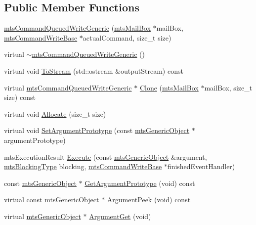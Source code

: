 \subsection*{Public Member Functions}
\begin{DoxyCompactItemize}
\item 
\hyperlink{classmts_command_queued_write_generic_aaafdcc6e3828ed2308806cd33da98c58}{mts\+Command\+Queued\+Write\+Generic} (\hyperlink{classmts_mail_box}{mts\+Mail\+Box} $\ast$mail\+Box, \hyperlink{classmts_command_write_base}{mts\+Command\+Write\+Base} $\ast$actual\+Command, size\+\_\+t size)
\item 
virtual \hyperlink{classmts_command_queued_write_generic_af6ee1d684b4a16823d61a85cd619c900}{$\sim$mts\+Command\+Queued\+Write\+Generic} ()
\item 
virtual void \hyperlink{classmts_command_queued_write_generic_a08ecb69cf7b48addc3ac1c2c00749862}{To\+Stream} (std\+::ostream \&output\+Stream) const 
\item 
virtual \hyperlink{classmts_command_queued_write_generic}{mts\+Command\+Queued\+Write\+Generic} $\ast$ \hyperlink{classmts_command_queued_write_generic_a19ab52abd7a5763ca948dfedb561956b}{Clone} (\hyperlink{classmts_mail_box}{mts\+Mail\+Box} $\ast$mail\+Box, size\+\_\+t size) const 
\item 
virtual void \hyperlink{classmts_command_queued_write_generic_a126f75b549a510e4ec11a5f2e48b570d}{Allocate} (size\+\_\+t size)
\item 
virtual void \hyperlink{classmts_command_queued_write_generic_a49574e06b777c7122675adb3022993ef}{Set\+Argument\+Prototype} (const \hyperlink{classmts_generic_object}{mts\+Generic\+Object} $\ast$argument\+Prototype)
\item 
mts\+Execution\+Result \hyperlink{classmts_command_queued_write_generic_ac80ac62ca14d0714e1090305e189d13d}{Execute} (const \hyperlink{classmts_generic_object}{mts\+Generic\+Object} \&argument, \hyperlink{mts_forward_declarations_8h_ad7426ccb6c883bc780d0ee197dddcbe7}{mts\+Blocking\+Type} blocking, \hyperlink{classmts_command_write_base}{mts\+Command\+Write\+Base} $\ast$finished\+Event\+Handler)
\item 
const \hyperlink{classmts_generic_object}{mts\+Generic\+Object} $\ast$ \hyperlink{classmts_command_queued_write_generic_a0213856735a304c121713cfa32e90f70}{Get\+Argument\+Prototype} (void) const 
\item 
virtual const \hyperlink{classmts_generic_object}{mts\+Generic\+Object} $\ast$ \hyperlink{classmts_command_queued_write_generic_a1a165e04b368372046169d786335588f}{Argument\+Peek} (void) const 
\item 
virtual \hyperlink{classmts_generic_object}{mts\+Generic\+Object} $\ast$ \hyperlink{classmts_command_queued_write_generic_adb83e8e295b8fca5b5d998fcc123083d}{Argument\+Get} (void)
\end{DoxyCompactItemize}
